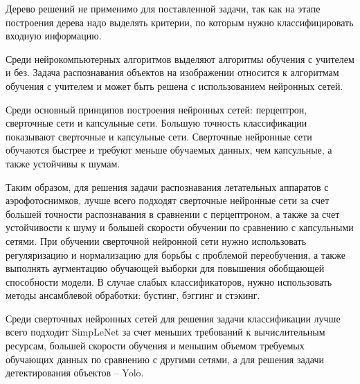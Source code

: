 Дерево решений не применимо для поставленной задачи, так как на этапе построения дерева надо выделять критерии, по которым нужно классифицировать входную информацию.

Среди нейрокомпьютерных алгоритмов выделяют алгоритмы обучения с учителем и без. Задача распознавания объектов на изображении относится к алгоритмам обучения с учителем и может быть решена с использованием нейронных сетей.

Среди основный принципов построения нейронных сетей: перцептрон, сверточные сети и капсульные сети. Большую точность классификации показывают сверточные и капсульные сети. Сверточные нейронные сети обучаются быстрее и требуют меньше обучаемых данных, чем капсульные, а также устойчивы к шумам.

Таким образом, для решения задачи распознавания летательных аппаратов с аэрофотоснимков, лучше всего подходят сверточные нейронные сети за счет большей точности распознавания в сравнении с перцептроном, а также за счет устойчивости к шуму и большей скорости обучении по сравнению с капсульными сетями. При обучении сверточной нейронной сети нужно использовать регуляризацию и нормализацию для борьбы с проблемой переобучения, а также выполнять аугментацию обучающей выборки для повышения обобщающей способности модели. В случае слабых классификаторов, нужно использовать методы ансамблевой обработки: бустинг, бэггинг и стэкинг.

Среди сверточных нейронных сетей для решения задачи классификации лучше всего подходит SimpLeNet за счет меньших требований к вычислительным ресурсам, большей скорости обучения и меньшим объемом требуемых обучающих данных по сравнению с другими сетями, а для решения задачи детектирования объектов -- Yolo.